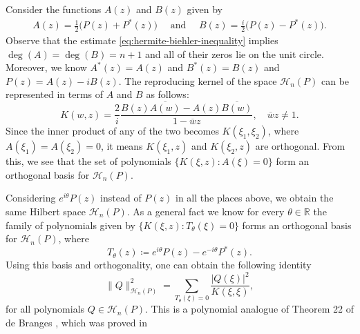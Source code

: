 \documentclass[reqno, a4paper]{amsart}
\def\R{\mathbb{R}}
\theoremstyle{plain}
\theoremstyle{definition}
\theoremstyle{remarkstyle}
\numberwithin{equation}{section}
\begin{document}
Consider the functions $A(z)$ and $B(z)$ given by 
\begin{align*}
    A(z)=\frac{1}{2} \bigl(P(z)+P^*(z)\bigr) \quad \text{ and } \quad 
    B(z)=\frac{i}{2} \bigl(P(z)-P^*(z)\bigr).
\end{align*}
Observe that the estimate \eqref{eq:hermite-biehler-inequality} implies $\operatorname{deg}(A)=\operatorname{deg}(B)=n+1$ and all of their zeros lie on the unit circle. Moreover, we know $A^*(z)=A(z)$ and $B^*(z)=B(z)$ and $P(z)= A(z)-i B(z)$.  The reproducing kernel of the space $\mathcal{H}_n(P)$ can be represented in terms of $A$ and $B$ as follows:
\begin{equation}\label{eq:reproducing-kernel-with-A-and-B}
    K(w, z)=\frac{2}{i}\frac{B(z)\overline{A(w)}-A(z)\overline{B(w)}}{1-\overline{w}z}, \quad \overline{w}z\neq 1.
\end{equation}
Since the inner product of any of the two becomes $K(\xi_1, \xi_2)$, where $A(\xi_1)=A(\xi_2)=0$, it means $K(\xi_1, z)$ and $K(\xi_2, z)$ are orthogonal. From this, we see that the set of polynomials $\{K(\xi, z): A(\xi)=0\}$ form an orthogonal basis for $\mathcal{H}_n(P)$. 

\smallskip

Considering $e^{i\theta} P(z)$ instead of $P(z)$ in all the places above, we obtain the same Hilbert space $\mathcal{H}_n(P)$. As a general fact we know for every $\theta\in \R$ the family of polynomials given by $\{K(\xi, z) : T_\theta(\xi)=0\}$ forms an orthogonal basis for $\mathcal{H}_n(P)$, where
\begin{equation*}
    T_\theta(z)\coloneqq e^{i\theta} P(z)-e^{-i\theta} P^*(z).    
\end{equation*}
Using this basis and orthogonality, one can obtain the following identity
\begin{equation}\label{eq:quadrature formula for the norm in RKHSoP}
    \lVert Q\rVert_{\mathcal{H}_n(P)}^2=\sum_{T_\theta(\xi)=0} \frac{\lvert Q(\xi)\rvert^2}{K(\xi, \xi)},
\end{equation}
for all polynomials $Q\in \mathcal{H}_n(P)$. This is a polynomial analogue of Theorem 22 of de Branges \cite{deBranges1968-HilbertSpacesOfEntireFunctions}, which was proved in \cite{LiReproducingKernelHilbertSpaces1997}
\end{document}
